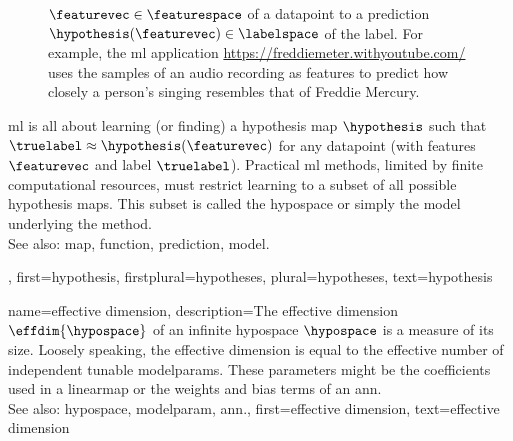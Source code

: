 {{\begin{figure}[H]
{			$\featurevec \in \featurespace$ of a \gls{datapoint} to a \gls{prediction} $\hypothesis(\featurevec) \in \labelspace$ of the \gls{label}. 
			For example, the \gls{ml} application \url{https://freddiemeter.withyoutube.com/} uses the \glspl{sample} of an audio 
			recording as \glspl{feature} to predict how closely a person’s singing resembles that of Freddie Mercury. }
		\end{figure}
		\Gls{ml} is all about learning (or finding) a hypothesis \gls{map} $\hypothesis$ 
		such that $\truelabel \approx \hypothesis(\featurevec)$ for any \gls{datapoint} 
		(with \glspl{feature} $\featurevec$ and \gls{label} $\truelabel$). Practical \gls{ml} methods, 
		limited by finite computational resources, must restrict learning to a subset of all possible 
		hypothesis \glspl{map}. This subset is called the \gls{hypospace} or simply the \gls{model} underlying 
		the method.
					\\ 
		See also: \gls{map}, \gls{function}, \gls{prediction}, \gls{model}.},
	first={hypothesis},
	firstplural={hypotheses},
	plural={hypotheses},
	text={hypothesis}  
}

{name={effective dimension},
	description={The effective \gls{dimension} $\effdim{\hypospace}$ of 
		an infinite \gls{hypospace} $\hypospace$ is a \gls{measure} of its size. Loosely speaking, the 
		effective \gls{dimension} is equal to the effective number of independent tunable \glspl{modelparam}. 
		These \glspl{parameter} might be the coefficients used in a \gls{linearmap} or the 
		\glspl{weight} and \gls{bias} terms of an \gls{ann}.
					\\ 
		See also: \gls{hypospace}, \gls{modelparam}, \gls{ann}.},
	first={effective dimension},
	text={effective dimension}  
}

